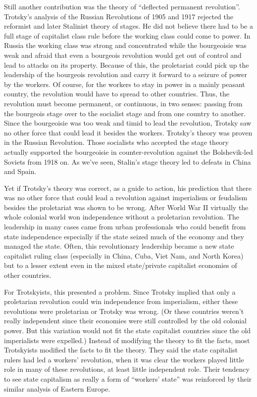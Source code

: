 Still another contribution was the theory of ``deflected permanent revolution''. Trotsky's analysis of the Russian Revolutions of 1905 and 1917 rejected the reformist and later Stalinist theory of stages. He did not believe there had to be a full stage of capitalist class rule before the working class could come to power. In Russia the working class was strong and concentrated while the bourgeoisie was weak and afraid that even a bourgeois revolution would get out of control and lead to attacks on its property. Because of this, the proletariat could pick up the leadership of the bourgeois revolution and carry it forward to a seizure of power by the workers. Of course, for the workers to stay in power in a mainly peasant country, the revolution would have to spread to other countries. Thus, the revolution must become permanent, or continuous, in two senses: passing from the bourgeois stage over to the socialist stage and from one country to another. Since the bourgeoisie was too weak and timid to lead the revolution, Trotsky saw no other force that could lead it besides the workers. Trotsky's theory was proven in the Russian Revolution. Those socialists who accepted the stage theory actually supported the bourgeoisie in counter-revolution against the Bolshevik-led Soviets from 1918 on. As we've seen, Stalin's stage theory led to defeats in China and Spain.

Yet if Trotsky's theory was correct, as a guide to action, his prediction that there was no other force that could lead a revolution against imperialism or feudalism besides the proletariat was shown to be wrong. After World War II virtually the whole colonial world won independence without a proletarian revolution. The leadership in many cases came from urban professionals who could benefit from state independence especially if the state seized much of the economy and they managed the state. Often, this revolutionary leadership became a new state capitalist ruling class (especially in China, Cuba, Viet Nam, and North Korea) but to a lesser extent even in the mixed state/private capitalist economies of other countries.

For Trotskyists, this presented a problem. Since Trotsky implied that only a proletarian revolution could win independence from imperialism, either these revolutions were proletarian or Trotsky was wrong. (Or these countries weren't really independent since their economies were still controlled by the old colonial power. But this variation would not fit the state capitalist countries since the old imperialists were expelled.) Instead of modifying the theory to fit the facts, most Trotskyists modified the facts to fit the theory. They said the state capitalist rulers had led a workers' revolution, when it was clear the workers played little role in many of these revolutions, at least little independent role. Their tendency to see state capitalism as really a form of ``workers' state'' was reinforced by their similar analysis of Eastern Europe.

